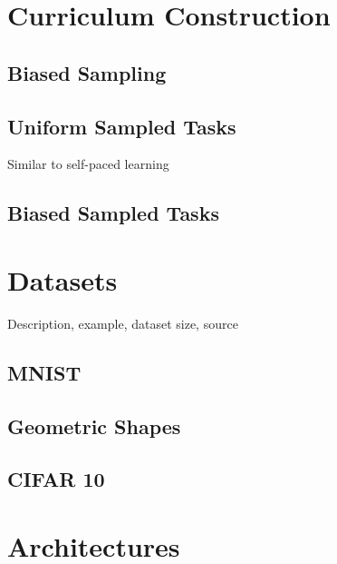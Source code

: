 \section{Curriculum Construction}

\subsection{Biased Sampling}

\subsection{Uniform Sampled Tasks}
Similar to self-paced learning
\subsection{Biased Sampled Tasks}


\section{Datasets}
Description, example, dataset size, source
\subsection{MNIST}

\subsection{Geometric Shapes}

\subsection{CIFAR 10}

\section{Architectures}